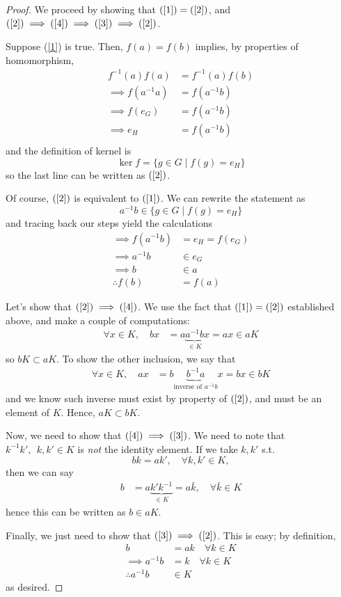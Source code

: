 \documentclass[11pt]{amsart} %
\theoremstyle{definition}
\theoremstyle{definition}
\numberwithin{equation}{section}
\begin{document}
\begin{proof}
	We proceed by showing that $(\ref{1}) = (\ref{2})$, and $(\ref{2}) \implies (\ref{4}) \implies (\ref{3}) \implies (\ref{2})$.
	
	Suppose (\ref{1}) is true. Then, $f(a) = f(b)$ implies, by properties of homomorphism,
	$$\begin{aligned}
	f^{-1} (a) f(a) &= f^{-1}(a)  f(b) \\
	\implies f(a^{-1} a ) &= f(a^{-1}b) \\
	\implies f( e_{G} ) &=f(a^{-1}b) \\
	\implies e_{H} &= f(a^{-1}b) \\
	\end{aligned}$$
	and the definition of kernel is
	$$ \ker f = \{ g \in G \mid f(g) = e_H \} $$
	so the last line can be written as $(\ref{2})$.
	
	Of course, $(\ref{2})$ is equivalent to $(\ref{1})$. We can rewrite the statement as
	$$ a^{-1} b \in \{ g \in G \mid f(g) = e_H \} $$
	and tracing back our steps yield the calculations
	$$\begin{aligned}
	\implies f(a^{-1} b ) &= e_H =  f( e_{G} ) \\
	\implies a^{-1} b &\in e_G \\
	\implies b &\in a \\
	\therefore f(b) &= f(a)
	\end{aligned}$$
	
	Let's show that $(\ref{2}) \implies (\ref{4})$. We use the fact that $(\ref{1}) = (\ref{2})$ established above, and make a couple of computations:
	$$ \begin{aligned}
	\forall x \in K, \quad bx &= a\underbrace{a^{-1}b}_{\in K} x = ax \in aK
	\end{aligned} $$
	so $bK \subset aK$. To show the other inclusion, we say that
	$$\begin{aligned}
	\forall x \in K, \quad ax &= b\underbrace{b^{-1}a}_{\text{inverse of } a^{-1}b } x = bx \in bK
	\end{aligned}$$
	and we know such inverse must exist by property of $(\ref{2})$, and must be an element of $K$. Hence, $aK \subset bK$.
	
	Now, we need to show that $(\ref{4}) \implies (\ref{3})$. We need to note that $k^{-1} k', \: \: k, k' \in K$ is \textit{not} the identity element. If we take $k, k'$ s.t.
	$$ bk = ak', \quad \forall k,k' \in K, $$
	then we can say
	$$\begin{aligned}
	b&= a \underbrace{k' k^{-1} }_{\in K} = a\bar{k}, \quad \forall \bar{k} \in K 
	\end{aligned}$$
	hence this can be written as $b \in aK$.
	
	Finally, we just need to show that $(\ref{3}) \implies (\ref{2})$. This is easy; by definition,
	\begin{align*}
	b &= ak \quad \forall k \in K \\
	\implies a^{-1} b &= k \quad \forall k \in K \\
	\therefore a^{-1} b &\in K
	\end{align*}
	as desired.
\end{proof}
\end{document}
